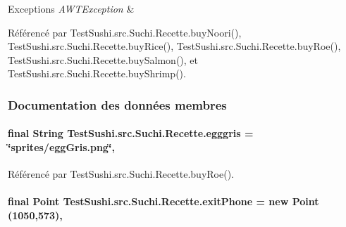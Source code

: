 \begin{DoxyExceptions}{Exceptions}
{\em A\+W\+T\+Exception} & \\
\hline
\end{DoxyExceptions}


Référencé par Test\+Sushi.\+src.\+Suchi.\+Recette.\+buy\+Noori(), Test\+Sushi.\+src.\+Suchi.\+Recette.\+buy\+Rice(), Test\+Sushi.\+src.\+Suchi.\+Recette.\+buy\+Roe(), Test\+Sushi.\+src.\+Suchi.\+Recette.\+buy\+Salmon(), et Test\+Sushi.\+src.\+Suchi.\+Recette.\+buy\+Shrimp().



\subsubsection{Documentation des données membres}
\hypertarget{classTestSushi_1_1src_1_1Suchi_1_1Recette_a14892e43d9ed57350effdf3ed1bddb8a}{}
\paragraph[{egggris}]{\setlength{\rightskip}{0pt plus 5cm}final String Test\+Sushi.\+src.\+Suchi.\+Recette.\+egggris = \char`\"{}sprites/egg\+Gris.\+png\char`\"{}\hspace{0.3cm}{\ttfamily [protected]}, {\ttfamily [inherited]}}\label{classTestSushi_1_1src_1_1Suchi_1_1Recette_a14892e43d9ed57350effdf3ed1bddb8a}


Référencé par Test\+Sushi.\+src.\+Suchi.\+Recette.\+buy\+Roe().

\hypertarget{classTestSushi_1_1src_1_1Suchi_1_1Recette_aecc6de3619013f1fb5f506c1e4e9ad7b}{}
\paragraph[{exit\+Phone}]{\setlength{\rightskip}{0pt plus 5cm}final Point Test\+Sushi.\+src.\+Suchi.\+Recette.\+exit\+Phone = new Point (1050,573)\hspace{0.3cm}{\ttfamily [protected]}, {\ttfamily [inherited]}}\label{classTestSushi_1_1src_1_1Suchi_1_1Recette_aecc6de3619013f1fb5f506c1e4e9ad7b}
\hypertarget{classTestSushi_1_1src_1_1Suchi_1_1Recette_a2f5cec48c186dc52c3d990df66f3a8cf}{}
